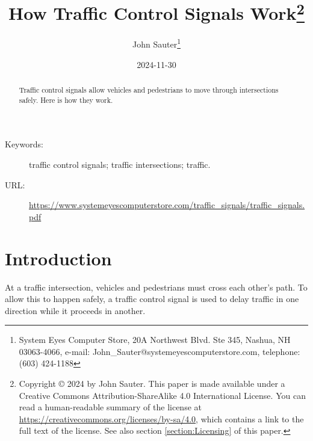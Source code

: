 \documentclass[letterpaper,twoside]{article}
\begin{document}
\title{How Traffic Control Signals Work\footnote{Copyright
    {\copyright} 2024 by John Sauter.
    This paper is made available under a
    Creative Commons Attribution-ShareAlike 4.0 International License.
    You can read a human-readable summary of the license at
    \href{https://creativecommons.org/licenses/by-sa/4.0}{https://creativecommons.org/licenses/by-sa/4.0},
    which contains a link to the full text of the license.
    See also section \ref{section:Licensing} of this paper.}
}
\author{John Sauter\footnote{
    System Eyes Computer Store,
    20A Northwest Blvd.  Ste 345,
    Nashua, NH  03063-4066,
    e-mail: John\_Sauter@systemeyescomputerstore.com,
    telephone: (603) 424-1188}}

\date{2024-11-30}
\maketitle
\begin{abstract}
  Traffic control signals allow vehicles and pedestrians to move through
  intersections safely.  Here is how they work.
\end{abstract}
\begin{description}
\item[Keywords:]traffic control signals; traffic intersections; traffic.
\item[URL:]\href{https://www.systemeyescomputerstore.com/traffic\_signals/traffic\_signalst.pdf}{https://www.systemeyescomputerstore.com/traffic\_signals/traffic\_signals.pdf}
\end{description}
\newpage

\section{Introduction}
At a traffic intersection, vehicles and pedestrians must cross each other's
path.  To allow this to happen safely, a traffic control signal is used to
delay traffic in one direction while it proceeds in another.
\end{document}
